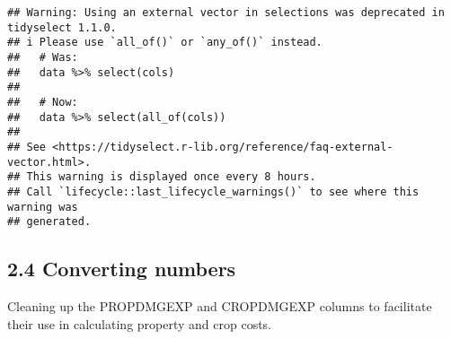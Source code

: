 \documentclass[
]{article}
\begin{document}
\begin{verbatim}
## Warning: Using an external vector in selections was deprecated in tidyselect 1.1.0.
## i Please use `all_of()` or `any_of()` instead.
##   # Was:
##   data %>% select(cols)
## 
##   # Now:
##   data %>% select(all_of(cols))
## 
## See <https://tidyselect.r-lib.org/reference/faq-external-vector.html>.
## This warning is displayed once every 8 hours.
## Call `lifecycle::last_lifecycle_warnings()` to see where this warning was
## generated.
\end{verbatim}

\hypertarget{converting-numbers}{%
\subsection{2.4 Converting numbers}\label{converting-numbers}}

Cleaning up the PROPDMGEXP and CROPDMGEXP columns to facilitate their
use in calculating property and crop costs.
\end{document}
